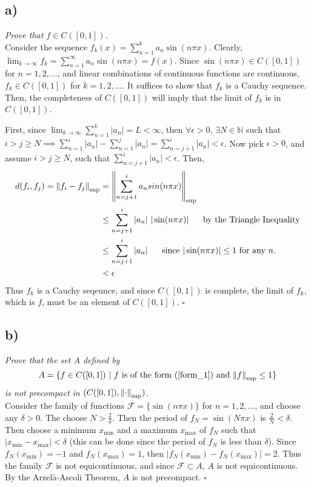 \documentclass[12pt]{article}
\begin{document}
\subsection*{ a)}
\emph{Prove that $f \in C([0,1])$.} \\

Consider the sequence $f_k(x) = \sum_{n=1}^k a_n \sin(n\pi x)$.  Clearly, $\lim_{k\rightarrow\infty}f_k = \sum_{n=1}^\infty a_n \sin (n\pi x) = f(x)$.  Since $\sin(n\pi x) \in C([0,1])$ for $n = 1, 2, \dots$, and linear combinations of continuous functions are continuous, $f_k \in C([0,1])$ for $k = 1, 2, \dots$.  It suffices to show that $f_k$ is a Cauchy sequence.  Then, the completeness of $C([0,1])$ will imply that the limit of $f_k$ is in $C([0,1])$.

First, since $\lim_{k\rightarrow\infty}\sum_{n=1}^k|a_n| = L < \infty$, then $\forall \epsilon>0$, $\exists N\in\mathbb{N}$ such that $i > j \geq N \implies \sum_{n=1}^i |a_n| - \sum_{n=1}^j |a_n| = \sum_{n=j+1}^i |a_n| < \epsilon$.  Now pick $\epsilon > 0$, and assume $i > j \geq N$, such that $\sum_{n=j+1}^i |a_n| < \epsilon$.  Then,
\begin{align*}
	d(f_i, f_j) = \norm{f_i - f_j}_{\text{sup}} &= \norm{\sum_{n=j+1}^i a_n sin(n\pi x)}_{\text{sup}} \\
	&\leq \sum_{n=j+1}^i |a_n|\ |\sin(n\pi x)|\ \ \ \ \ \text{by the Triangle Inequality} \\
	&\leq \sum_{n=j+1}^i |a_n|\ \ \ \ \ \text{since $|\sin(n\pi x)| \leq 1$ for any $n$.} \\
	&< \epsilon
\end{align*}
Thus $f_k$ is a Cauchy seqeunce, and since $C([0,1])$ is complete, the limit of $f_k$, which is $f$, must be an element of $C([0,1])$. \hfill $\square$

\subsection*{ b)}
\emph{Prove that the set $A$ defined by}
\begin{equation*}
	A = \{f \in C([0,1])\ |\ f \text{ is of the form (\ref{form_1}) and } \norm{f}_{\text{sup}} \leq 1\}
\end{equation*}
\emph{is not precompact in $(C([0,1]), \norm{\cdot}_{\text{sup}})$.} \\

Consider the family of functions $\mathcal{F} = \{\sin(n\pi x)\}$ for $n = 1, 2, \dots$, and choose any $\delta > 0$.  The choose $N > \frac{2}{\delta}$.  Then the period of $f_N = \sin(N\pi x)$ is $\frac{2}{N} < \delta$.  Then choose a minimum $x_{\text{min}}$ and a maximum $x_{\text{max}}$ of $f_N$ such that $|x_{\text{min}} - x_{\text{max}}| < \delta$ (this can be done since the period of $f_N$ is less than $\delta$).  Since $f_N(x_{\text{min}}) = -1$ and $f_N(x_{\text{max}}) = 1$, then $|f_N(x_{\text{min}}) - f_N(x_{\text{max}})| = 2$.  Thus the family $\mathcal{F}$ is not equicontinuous, and since $\mathcal{F} \subset A$, $A$ is not equicontinuous.  By the Arzel\`a-Ascoli Theorem, $A$ is not precompact. \hfill $\square$
\end{document}
